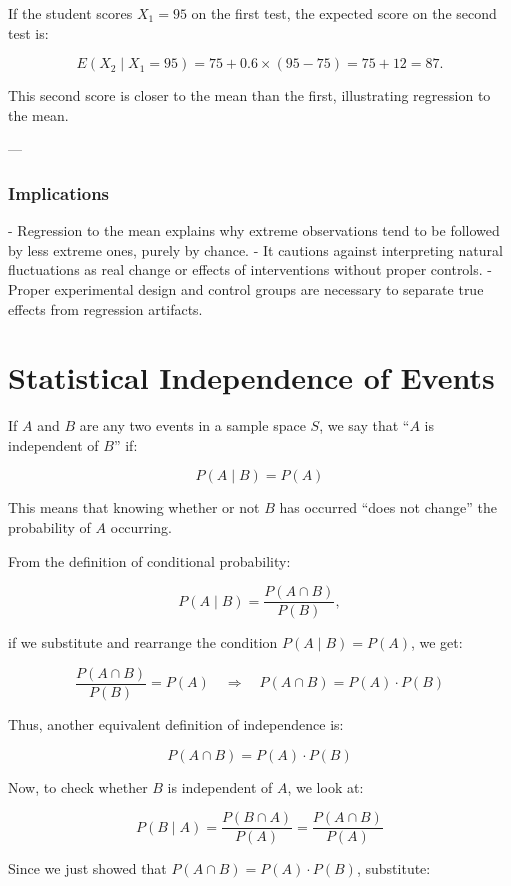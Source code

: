\documentclass[twoside]{book}
\begin{document}
If the student scores \(X_1 = 95\) on the first test, the expected score on the second test is:

\[
E(X_2 \mid X_1 = 95) = 75 + 0.6 \times (95 - 75) = 75 + 12 = 87.
\]

This second score is closer to the mean than the first, illustrating regression to the mean.

---

\subsubsection*{Implications}

- Regression to the mean explains why extreme observations tend to be followed by less extreme ones, purely by chance.
- It cautions against interpreting natural fluctuations as real change or effects of interventions without proper controls.
- Proper experimental design and control groups are necessary to separate true effects from regression artifacts.



\section{Statistical Independence of Events}

If $A$ and $B$ are any two events in a sample space $S$, we say that ``$A$ is independent of $B$'' if:

$$
P(A \mid B) = P(A)
$$

This means that knowing whether or not $B$ has occurred ``does not change'' the probability of $A$ occurring.

From the definition of conditional probability:

$$
P(A \mid B) = \frac{P(A \cap B)}{P(B)},
$$

if we substitute and rearrange the condition $P(A \mid B) = P(A)$, we get:

$$
\frac{P(A \cap B)}{P(B)} = P(A) \quad \Rightarrow \quad P(A \cap B) = P(A) \cdot P(B)
$$

Thus, another equivalent definition of independence is:

$$
P(A \cap B) = P(A) \cdot P(B)
$$

Now, to check whether $B$ is independent of $A$, we look at:

$$
P(B \mid A) = \frac{P(B \cap A)}{P(A)} = \frac{P(A \cap B)}{P(A)}
$$

Since we just showed that $P(A \cap B) = P(A) \cdot P(B)$, substitute:
\end{document}
